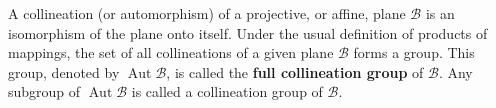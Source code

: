 A collineation (or automorphism) of a projective, or affine, plane $\mathcal{B}$ is an isomorphism of the plane onto itself. Under the usual definition of products of mappings, the set of all collineations of a given plane $\mathcal{B}$ forms a group. This group, denoted by $\operatorname{Aut} \mathcal{B}$, is called the \textbf{full collineation group} of $\mathcal{B}$. Any subgroup of $\operatorname{Aut} \mathcal{B}$ is called a collineation group of $\mathcal{B}$.

